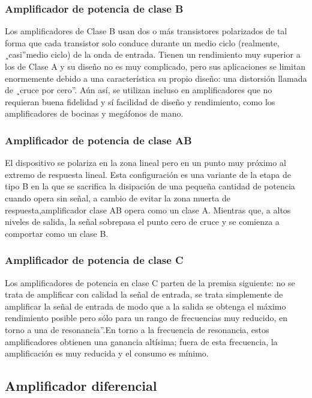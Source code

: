 \subsubsection{Amplificador de potencia de clase B}

Los amplificadores de Clase B usan dos o más transistores polarizados de tal forma que
cada transistor solo conduce durante un medio ciclo (realmente, ¸casi”medio ciclo) de la
onda de entrada. Tienen un rendimiento muy superior a los de Clase A y su diseño no es
muy complicado, pero sus aplicaciones se limitan enormemente debido a una característica
su propio diseño: una distorsión llamada de ¸cruce por cero”. Aún así, se utilizan incluso
en amplificadores que no requieran buena fidelidad y sí facilidad de diseño y rendimiento,
como los amplificadores de bocinas y megáfonos de mano.


\subsubsection{Amplificador de potencia de clase AB}

El dispositivo se polariza en la zona lineal pero en un punto muy próximo al extremo
de respuesta lineal. Esta configuración es una variante de la etapa de tipo B en la que
se sacrifica la disipación de una pequeña cantidad de potencia cuando opera sin señal, a
cambio de evitar la zona muerta de respuesta,amplificador clase AB opera como un clase
A. Mientras que, a altos niveles de salida, la señal sobrepasa el punto cero de cruce y se
comienza a comportar como un clase B.

\subsubsection{Amplificador de potencia de clase C}

Los amplificadores de potencia en clase C parten de la premisa siguiente: no se trata
de amplificar con calidad la señal de entrada, se trata simplemente de amplificar la señal
de entrada de modo que a la salida se obtenga el máximo rendimiento posible pero sólo
para un rango de frecuencias muy reducido, en torno a una de resonancia”.En torno a la
frecuencia de resonancia, estos amplificadores obtienen una ganancia altísima; fuera de esta
frecuencia, la amplificación es muy reducida y el consumo es mínimo.

\subsection{Amplificador diferencial}

